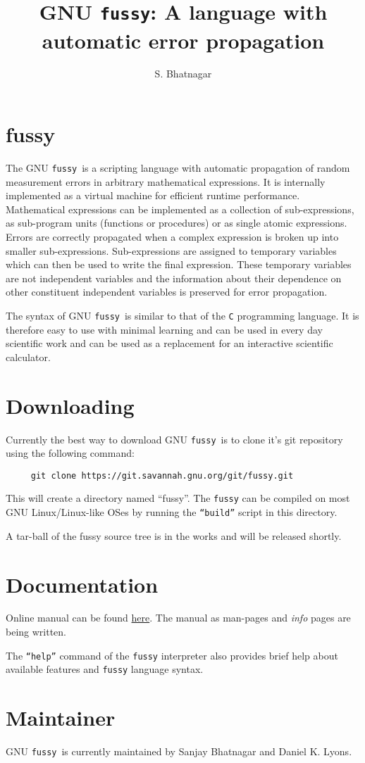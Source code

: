\documentclass[11pt]{article}
\newcommand{\Fussy}{GNU {\tt fussy}}
\newcommand{\PDFVersion}  {\htmladdnormallinkfoot{PDF version}{http://www.aoc.nrao.edu/~sbhatnag/Softwares/fussy/fussy.pdf}}
\begin{document}
\title{{\Fussy}: A language with automatic error propagation}
\author{S. Bhatnagar}
\date{}
\normalsize


\section*{fussy}
The \Fussy\ is a scripting language with automatic propagation of random
measurement errors in arbitrary mathematical expressions.  It is internally implemented
as a virtual machine for efficient runtime performance.  Mathematical
expressions can be implemented as a collection of sub-expressions, as sub-program units
(functions or procedures) or as single atomic expressions.  Errors are correctly
propagated when a complex expression is broken up into smaller sub-expressions.
Sub-expressions are assigned to temporary variables which can then be used to write the
final expression.  These temporary variables are not independent variables and the
information about their dependence on other constituent independent variables is
preserved for error propagation.

The syntax of \Fussy\ is similar to that of the {\tt C} programming language.  It is
therefore easy to use with minimal learning and can be used in every day scientific work
and can be used as a replacement for an interactive scientific calculator.

\section*{Downloading}
Currently the best way to download \Fussy\ is to clone it's git repository using the
following command:
\begin{verbatim}
     git clone https://git.savannah.gnu.org/git/fussy.git
\end{verbatim}
This will create a directory named ``fussy''.  The {\tt fussy} can be compiled on most
GNU Linux/Linux-like OSes by running the {\tt ``build''} script in this directory.

A tar-ball of the fussy source tree is in the works and will be released shortly.

\section*{Documentation}
Online manual can be found \href{https://www.gnu.org/software/fussy/manual/manual.html}{here}.  The manual as
man-pages and {\it info} pages are being written.

The {\tt ``help''} command of the {\tt fussy} interpreter also provides brief help about
available features and {\tt fussy} language syntax.


\section*{Maintainer}
\Fussy\ is currently maintained by Sanjay Bhatnagar and Daniel K. Lyons.
\end{document}
